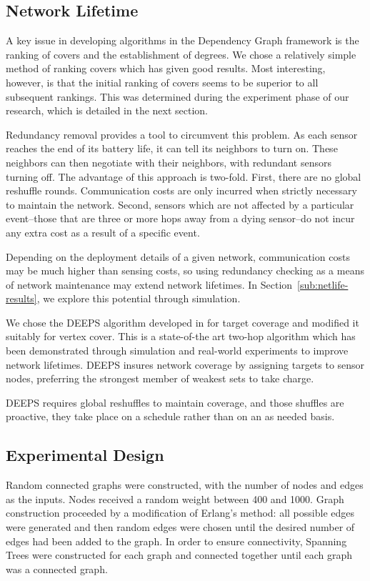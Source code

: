 \subsection{Network Lifetime}

A key issue in developing algorithms in the Dependency Graph framework is the ranking of covers and the establishment of degrees. We chose a relatively simple method of ranking covers which has given good results. Most interesting, however, is that the initial ranking of covers seems to be superior to all subsequent rankings. This was determined during the experiment phase of our research, which is detailed in the next section.

Redundancy removal provides a tool to circumvent this problem. As each sensor reaches the end of its battery life, it can tell its neighbors to turn on. These neighbors can then negotiate with their neighbors, with redundant sensors turning off. The advantage of this approach is two-fold. First, there are no global reshuffle rounds. Communication costs are only incurred when strictly necessary to maintain the network. Second, sensors which are not affected by a particular event--those that are three or more hops away from a dying sensor--do not incur any extra cost as a result of a specific event.

Depending on the deployment details of a given network, communication costs may be much higher than sensing costs, so using redundancy checking as a means of network maintenance may extend network lifetimes. In Section~\ref{sub:netlife-results}, we explore this potential through simulation.

We chose the DEEPS algorithm developed in \cite{1640702}for target coverage and modified it suitably for vertex cover. This is a state-of-the art two-hop algorithm which has been demonstrated through simulation and real-world experiments to improve network lifetimes. DEEPS insures network coverage by assigning targets to sensor nodes, preferring the strongest member of weakest sets to take charge. 

DEEPS requires global reshuffles to maintain coverage, and those shuffles are proactive, they take place on a schedule rather than on an as needed basis.

\subsection{Experimental Design}
\label{sub:exp-design}
Random connected graphs were constructed, with the number of nodes and edges as the inputs. Nodes received a random weight between 400 and 1000. Graph construction proceeded by a modification of Erlang's method: all possible edges were generated and then random edges were chosen until the desired number of edges had been added to the graph. In order to ensure connectivity, Spanning Trees were constructed for each graph and connected together until each graph was a connected graph. 

